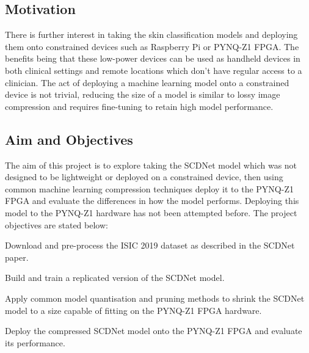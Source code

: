 \documentclass[12pt,nonacm,acmlarge,titlepage,screen]{acmart}
\begin{document}
	\subsection{Motivation} \label{sec:motivations}
	There is further interest in taking the skin classification models and deploying them onto constrained devices such as Raspberry Pi or PYNQ-Z1 FPGA. The benefits being that these low-power devices can be used as handheld devices in both clinical settings and remote locations which don't have regular access to a clinician. The act of deploying a machine learning model onto a constrained device is not trivial, reducing the size of a model is similar to lossy image compression and requires fine-tuning to retain high model performance.

	\subsection{Aim and Objectives} \label{sec:intro_aim}
	The aim of this project is to explore taking the SCDNet model \cite{scdnet_2022} which was not designed to be lightweight or deployed on a constrained device, then using common machine learning compression techniques deploy it to the PYNQ-Z1 FPGA and evaluate the differences in how the model performs. Deploying this model to the PYNQ-Z1 hardware has not been attempted before. The project objectives are stated below:
	\begin{objs}
		\item\label{obj:data_prep} Download and pre-process the ISIC 2019 dataset as described in the SCDNet paper.
		\item\label{obj:train} Build and train a replicated version of the SCDNet model.
		\item\label{obj:compress} Apply common model quantisation and pruning methods to shrink the SCDNet model to a size capable of fitting on the PYNQ-Z1 FPGA hardware.
		\item\label{obj:deploy} Deploy the compressed SCDNet model onto the PYNQ-Z1 FPGA and evaluate its performance.
	\end{objs}



%
%
\newpage
\end{document}
